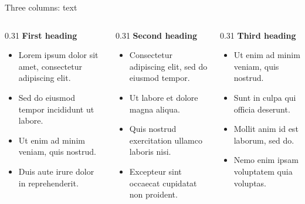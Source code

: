 \begin{frame}[t]{Three columns: text}
    \begin{columns}[T,onlytextwidth]
        \begin{column}{0.31\textwidth}
            \textbf{First heading}
            \begin{itemize}
                \item Lorem ipsum dolor sit amet, consectetur adipiscing elit.
                \item Sed do eiusmod tempor incididunt ut labore.
                \item Ut enim ad minim veniam, quis nostrud.
                \item Duis aute irure dolor in reprehenderit.
            \end{itemize}
        \end{column}
        \begin{column}{0.31\textwidth}
            \textbf{Second heading}
            \begin{itemize}
                \item Consectetur adipiscing elit, sed do eiusmod tempor.
                \item Ut labore et dolore magna aliqua.
                \item Quis nostrud exercitation ullamco laboris nisi.
                \item Excepteur sint occaecat cupidatat non proident.
            \end{itemize}
        \end{column}
        \begin{column}{0.31\textwidth}
            \textbf{Third heading}
            \begin{itemize}
                \item Ut enim ad minim veniam, quis nostrud.
                \item Sunt in culpa qui officia deserunt.
                \item Mollit anim id est laborum, sed do.
                \item Nemo enim ipsam voluptatem quia voluptas.
            \end{itemize}
        \end{column}
    \end{columns}
\end{frame}

